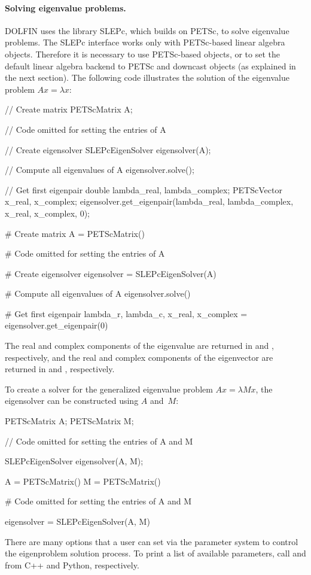 \paragraph{Solving eigenvalue problems.}

DOLFIN uses the library SLEPc, which builds on PETSc, to solve eigenvalue
problems. The SLEPc interface works only with PETSc-based linear algebra
objects.  Therefore it is necessary to use PETSc-based objects, or to
set the default linear algebra backend to PETSc and downcast objects
(as explained in the next section). The following code illustrates
the solution of the eigenvalue problem $Ax = \lambda x$:
\begin{c++}
// Create matrix
PETScMatrix A;

// Code omitted for setting the entries of A

// Create eigensolver
SLEPcEigenSolver eigensolver(A);

// Compute all eigenvalues of A
eigensolver.solve();

// Get first eigenpair
double lambda_real, lambda_complex;
PETScVector x_real, x_complex;
eigensolver.get_eigenpair(lambda_real, lambda_complex, x_real, x_complex, 0);
\end{c++}
\begin{python}
# Create matrix
A = PETScMatrix()

# Code omitted for setting the entries of A

# Create eigensolver
eigensolver = SLEPcEigenSolver(A)

# Compute all eigenvalues of A
eigensolver.solve()

# Get first eigenpair
lambda_r, lambda_c, x_real, x_complex = eigensolver.get_eigenpair(0)
\end{python}
The real and complex components of the eigenvalue are returned in
 and , respectively, and the
real and complex components of the eigenvector are
returned in  and , respectively.

To create a solver for the generalized eigenvalue problem $Ax = \lambda Mx$, the
eigensolver can be constructed using $A$ and~$M$:

\begin{c++}
PETScMatrix A;
PETScMatrix M;

// Code omitted for setting the entries of A and M

SLEPcEigenSolver eigensolver(A, M);
\end{c++}
\begin{python}
A = PETScMatrix()
M = PETScMatrix()

# Code omitted for setting the entries of A and M

eigensolver = SLEPcEigenSolver(A, M)
\end{python}
There are many options that a user can set via the parameter system to
control the eigenproblem solution process. To print a list of
available parameters, call 
and  from C++ and Python,
respectively.


